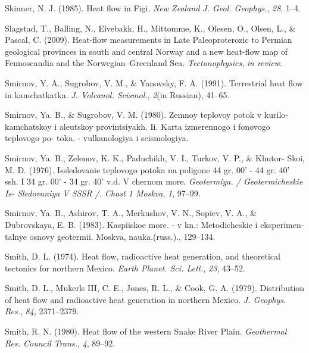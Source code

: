 \documentclass[draft,linenumbers]{agujournal2018}
\begin{document}
\leavevmode{}%
Skinner, N. J. (1985). Heat flow in {Figi}. \emph{New Zealand J. Geol.
Geophys.}, \emph{28}, 1--4.

\leavevmode{}%
Slagstad, T., Balling, N., Elvebakk, H., Mittomme, K., Olesen, O.,
Olsen, L., \& Pascal, C. (2009). Heat-flow measurements in {Late
Paleoproterozic to Permian} geological provinces in south and central
{Norway} and a new heat-flow map of {Fennoscandia and the
Norwegian--Greenland Sea}. \emph{Tectonophysics}, \emph{in review}.

\leavevmode{}%
Smirnov, Y. A., Sugrobov, V. M., \& Yanovsky, F. A. (1991). Terrestrial
heat flow in kamchatkatka. \emph{J. Volcanol. Seismol.}, \emph{2}(in
Russian), 41--65.

\leavevmode{}%
Smirnov, Ya. B., \& Sugrobov, V. M. (1980). Zemnoy teplovoy potok v
kurilo-kamchatskoy i aleutskoy provintsiyakh. Ii. Karta izmerennogo i
fonovogo teplovogo po- toka. - vulkanologiya i seismologiya.

\leavevmode{}%
Smirnov, Ya. B., Zelenov, K. K., Paduchikh, V. I., Turkov, V. P., \&
Khutor- Skoi, M. D. (1976). Issledovanie teplovogo potoka na poligone 44
gr. 00' - 44 gr. 40' ssh. I 34 gr. 00' - 34 gr. 40' v.d. V chernom more.
\emph{Geotermiya. / Geotermicheskie Is- Sledovaniya V SSSR /. Chast 1
Moskva}, \emph{1}, 97--99.

\leavevmode{}%
Smirnov, Ya. B., Ashirov, T. A., Merkushov, V. N., Sopiev, V. A., \&
Dubrovskaya, E. B. (1983). Kaspiiskoe more. - v kn.: Metodicheskie i
eksperimen- talnye osnovy geotermii. Moskva, nauka.(russ.)., 129--134.

\leavevmode{}%
Smith, D. L. (1974). Heat flow, radioactive heat generation, and
theoretical tectonics for northern {Mexico}. \emph{Earth Planet. Sci.
Lett.}, \emph{23}, 43--52.

\leavevmode{}%
Smith, D. L., Mukerls III, C. E., Jones, R. L., \& Cook, G. A. (1979).
Distribution of heat flow and radioactive heat generation in northern
{Mexico}. \emph{J. Geophys. Res.}, \emph{84}, 2371--2379.

\leavevmode{}%
Smith, R. N. (1980). Heat flow of the western {Snake River Plain}.
\emph{Geothermal Res. Council Trans.}, \emph{4}, 89--92.
\end{document}
